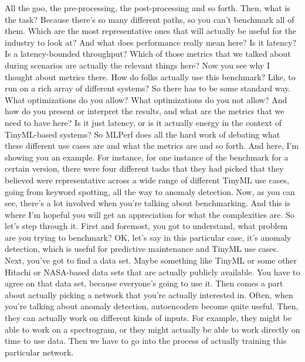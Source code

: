 {{{{{{{    All the goo, the pre-processing, the post-processing and so forth.
    Then, what is the task?
    Because there's so many different paths, so you can't benchmark all of them.
    Which are the most representative ones that will actually
    be useful for the industry to look at?
    And what does performance really mean here?
    Is it latency?
    Is a latency-bounded throughput?
    Which of those metrics that we talked about during scenarios
    are actually the relevant things here?
    Now you see why I thought about metrics there.
    How do folks actually use this benchmark?
    Like, to run on a rich array of different systems?
    So there has to be some standard way.
    What optimizations do you allow?
    What optimizations do you not allow?
    And how do you present or interpret the results,
    and what are the metrics that we need to have here?
    Is it just latency, or is it actually energy
    in the context of TinyML-based systems?
    So MLPerf does all the hard work of debating
    what these different use cases are and what the metrics are and so forth.
    And here, I'm showing you an example.
    For instance, for one instance of the benchmark for a certain version,
    there were four different tasks that they
    had picked that they believed were representative
    across a wide range of different TinyML use cases,
    going from keyword spotting, all the way to anomaly detection.
    Now, as you can see, there's a lot involved
    when you're talking about benchmarking.
    And this is where I'm hopeful you will get an appreciation for what
    the complexities are.
    So let's step through it.
    First and foremost, you got to understand, what problem are you
    trying to benchmark?
    OK, let's say in this particular case, it's
    anomaly detection, which is useful for predictive maintenance and TinyML use
    cases.
    Next, you've got to find a data set.
    Maybe something like TinyML or some other Hitachi or NASA-based data
    sets that are actually publicly available.
    You have to agree on that data set, because everyone's going to use it.
    Then comes a part about actually picking a network
    that you're actually interested in.
    Often, when you're talking about anomaly detection,
    autoencoders become quite useful.
    Then, they can actually work on different kinds of inputs.
    For example, they might be able to work on a spectrogram,
    or they might actually be able to work directly on time to use data.
    Then we have to go into the process of actually training
    this particular network.
}}}}}}}
